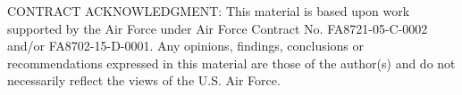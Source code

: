 \documentclass[journal]{IEEEtran}
\begin{document}
CONTRACT ACKNOWLEDGMENT: This material is based upon work supported by the Air Force under Air Force Contract No. FA8721-05-C-0002 and/or FA8702-15-D-0001. Any opinions, findings, conclusions or recommendations expressed in this material are those of the author(s) and do not necessarily reflect the views of the U.S. Air Force. 







%

\end{document}
